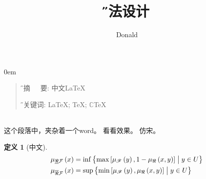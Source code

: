 \documentclass[12pt,a4paper,twoside]{article}
\title{\H 算法设计}
\author{Donald}
\date{}
\begin{document}
\maketitle


\theoremstyle{plain}
 \theoremindent0em
\theoremseparator{\hspace{1em}} 
\theoremsymbol{} 
\newtheorem{theorem}{\hspace{2em}定理}
\newtheorem{definition}{\hspace{2em}定义}
\newtheorem{lemma}{\hspace{2em}引理}
\newtheorem{corollary}{\hspace{2em}推论}

\newcommand{\ET}{\mathcal{T}}     
\newcommand{\ES}{\mathcal{S}}
\newcommand{\EN}{\mathcal{N}}
\newcommand{\EI}{\mathcal{I}}
\newcommand{\EF}{\mathcal{F}}
\newcommand{\HF}{\mathscr{F}} 

\renewcommand\refname{\small \H 参考文献}         
\renewcommand\tablename{\small \H 表}

\pagestyle{fancy}
\fancyhead{}                                   
\fancyhead[CE]{ }                              
\fancyhead[RO]{\thepage}          
\fancyhead[LE]{\thepage}           
\fancyfoot[C]{}   

\renewcommand{\headrulewidth}{0.4pt}      
\addtolength{\headsep}{-1em}                
\sloppy    

\begin{quote}\small
{\H\quad 摘~~~要:}
          {\K 中文\LaTeX{}
                 }

 {\H \quad 关键词:} { \LaTeX{}; \TeX{}; $\mathbb{C}$\!\TeX{}}
\end{quote}

\noindent\hspace*{5cm} \hrulefill \hspace*{5cm}\\    

             

这个段落中，夹杂着一个{\E word}。
{\K 看看效果}。{ \F 仿宋。}


\begin{definition}[中文]\label{def:dubois} %
{\begin{eqnarray}
 \begin{split}
 \mu_{\underline{\Re}\mathcal {F}}\left( x\right)
      &= \inf\left\{\max \left[ \mu _{\HF} \left( y \right),1 - \mu_\Re\left(x,y\right) \right]\bigm| y \in U  \right\} \\
 \mu_{\overline{\Re}\mathcal {F}}\left( x\right)
      &= \sup\left\{{\min \left[ \mu _{\HF} \left( y \right),\mu_\Re\left(x,y\right) \right]\bigm| y \in U}\right\}
 \end{split}
\end{eqnarray}\label{eq:dubois1}}
\end{definition}
\end{document}
